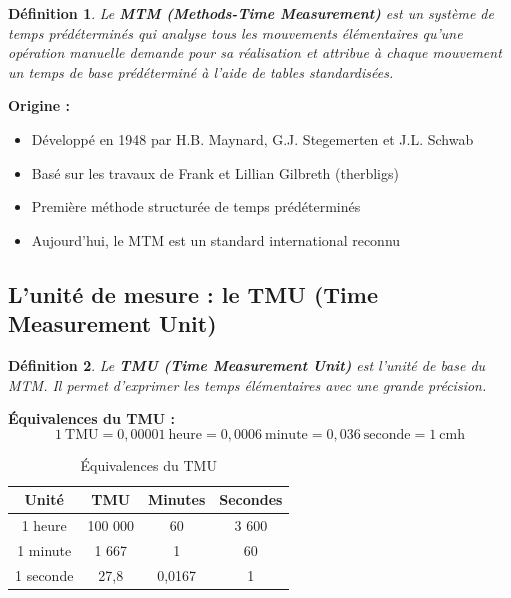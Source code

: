 \documentclass[a4paper,12pt]{article}
\newtheorem{definition}{Définition}[section]
\begin{document}
\begin{definition}
Le \textbf{MTM (Methods-Time Measurement)} est un système de temps prédéterminés qui analyse tous les mouvements élémentaires qu'une opération manuelle demande pour sa réalisation et attribue à chaque mouvement un temps de base prédéterminé à l'aide de tables standardisées.
\end{definition}

\textbf{Origine :}
\begin{itemize}
    \item Développé en 1948 par H.B. Maynard, G.J. Stegemerten et J.L. Schwab
    \item Basé sur les travaux de Frank et Lillian Gilbreth (therbligs)
    \item Première méthode structurée de temps prédéterminés
    \item Aujourd'hui, le MTM est un standard international reconnu
\end{itemize}

\begin{center}
\end{center}

\subsection{L'unité de mesure : le TMU (Time Measurement Unit)}

\begin{definition}
Le \textbf{TMU (Time Measurement Unit)} est l'unité de base du MTM. Il permet d'exprimer les temps élémentaires avec une grande précision.
\end{definition}

\textbf{Équivalences du TMU :}
\[
1\ \text{TMU} = 0,00001\ \text{heure} = 0,0006\ \text{minute} = 0,036\ \text{seconde} = 1\ \text{cmh}
\]

\begin{table}[ht]
\centering
\begin{tabular}{|c|c|c|c|}
\hline
\textbf{Unité} & \textbf{TMU} & \textbf{Minutes} & \textbf{Secondes} \\
\hline
1 heure & 100 000 & 60 & 3 600 \\
1 minute & 1 667 & 1 & 60 \\
1 seconde & 27,8 & 0,0167 & 1 \\
\hline
\end{tabular}
\caption{Équivalences du TMU}
\end{table}
\end{document}
